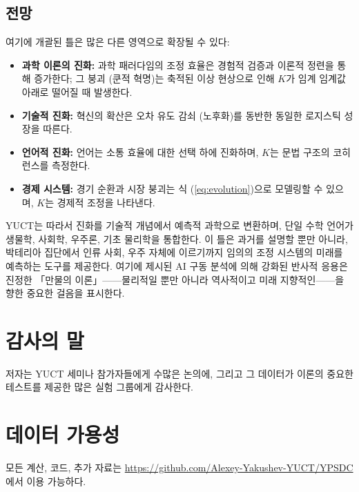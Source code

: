 \documentclass[12pt,a4paper]{article}
\theoremstyle{remark}
\begin{document}
	\subsection*{전망}
	
	여기에 개괄된 틀은 많은 다른 영역으로 확장될 수 있다:
	\begin{itemize}
		\item \textbf{과학 이론의 진화:} 과학 패러다임의 조정 효율은 경험적 검증과 이론적 정련을 통해 증가한다; 그 붕괴 (쿤적 혁명)는 축적된 이상 현상으로 인해 \(K\)가 임계 임계값 아래로 떨어질 때 발생한다.
		\item \textbf{기술적 진화:} 혁신의 확산은 오차 유도 감쇠 (노후화)를 동반한 동일한 로지스틱 성장을 따른다.
		\item \textbf{언어적 진화:} 언어는 소통 효율에 대한 선택 하에 진화하며, \(K\)는 문법 구조의 코히런스를 측정한다.
		\item \textbf{경제 시스템:} 경기 순환과 시장 붕괴는 식 (\ref{eq:evolution})으로 모델링할 수 있으며, \(K\)는 경제적 조정을 나타낸다.
	\end{itemize}
	
	YUCT는 따라서 진화를 기술적 개념에서 예측적 과학으로 변환하며, 단일 수학 언어가 생물학, 사회학, 우주론, 기초 물리학을 통합한다. 이 틀은 과거를 설명할 뿐만 아니라, 박테리아 집단에서 인류 사회, 우주 자체에 이르기까지 임의의 조정 시스템의 미래를 예측하는 도구를 제공한다. 여기에 제시된 AI 구동 분석에 의해 강화된 반사적 응용은 진정한 「만물의 이론」——물리적일 뿐만 아니라 역사적이고 미래 지향적인——을 향한 중요한 걸음을 표시한다.
	
	\section*{감사의 말}
	
	저자는 YUCT 세미나 참가자들에게 수많은 논의에, 그리고 그 데이터가 이론의 중요한 테스트를 제공한 많은 실험 그룹에게 감사한다.
	
	\section*{데이터 가용성}
	
	모든 계산, 코드, 추가 자료는 \url{https://github.com/Alexey-Yakushev-YUCT/YPSDC}에서 이용 가능하다.
	
\end{document}
